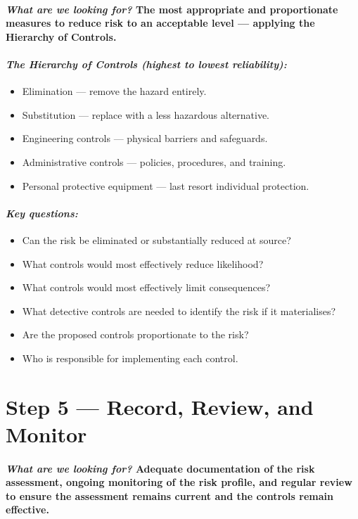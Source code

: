 \paragraph{\textit{What are we looking for?} The most appropriate and proportionate measures to reduce risk to an acceptable level — applying the Hierarchy of Controls.}
\paragraph{\textit{The Hierarchy of Controls (highest to lowest reliability):}}
\begin{itemize}
  \item{Elimination — remove the hazard entirely.}
  \item{Substitution — replace with a less hazardous alternative.}
  \item{Engineering controls — physical barriers and safeguards.}
  \item{Administrative controls — policies, procedures, and training.}
  \item{Personal protective equipment — last resort individual protection.}
\end{itemize}

\paragraph{\textit{Key questions:}}
\begin{itemize}
  \item{Can the risk be eliminated or substantially reduced at source?}
  \item{What controls would most effectively reduce likelihood?}
  \item{What controls would most effectively limit consequences?}
  \item{What detective controls are needed to identify the risk if it materialises?}
  \item{Are the proposed controls proportionate to the risk?}
  \item{Who is responsible for implementing each control.}
\end{itemize}


\section*{Step 5 — Record, Review, and Monitor}
\paragraph{\textit{What are we looking for?} Adequate documentation of the risk assessment, ongoing monitoring of the risk profile, and regular review to ensure the assessment remains current and the controls remain effective.}
